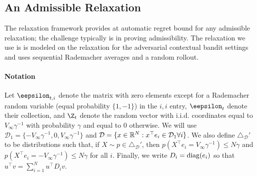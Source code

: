 \documentclass{article}
\begin{document}
\subsection{An Admissible Relaxation}
The relaxation framework provides at automatic regret bound for any admissible relaxation; the challenge typically is in proving admissibility. The relaxation we use is is modeled on the relaxation for the adversarial contextual bandit settings \cite{rakhlin2016bistro, syrgkanis2016improved} and uses sequential Rademacher averages and a random rollout.


\paragraph{Notation} Let $\eepsilon_{t,i}$ denote the matrix with zero elements except for a Rademacher random variable (equal probability $\{1,-1\}$) in the $i,i$ entry, $\eepsilon_t$ denote their collection, and $\Z_t$ denote the random vector with i.i.d. coordinates equal to $V_\infty\gamma^{-1}$ with probability $\gamma$ and equal to $0$ otherwise. We will use $\mathcal D_1 = \{-V_\infty \gamma^{-1},0,V_\infty \gamma^{-1}\}$ and $\mathcal D = \{x\in\mathbb R^N: x^\top e_i \in \mathcal D_1\forall i\}$. We also define $\triangle_{\mathcal D}'$ to be distributions such that, if $X\sim p\in \triangle_{\mathcal D}'$, then $p(X^\top e_i = V_\infty\gamma^{-1})\leq N\gamma$ and $p(X^\top e_i = -V_\infty\gamma^{-1})\leq N\gamma$ for all $i$. Finally, we write $D_i = \operatorname*{diag}(e_i)$ so that $u^\top v = \sum_{i=1}^N u^\top D_i v$.
\end{document}
